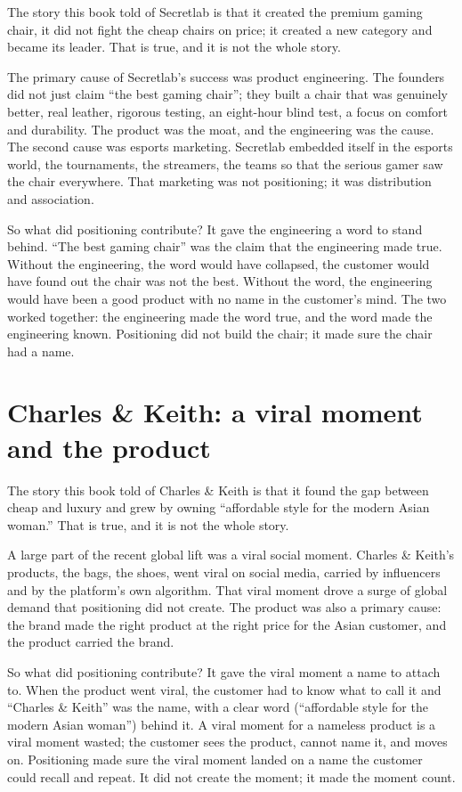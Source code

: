 \documentclass[10pt,twoside,openany]{memoir}
\newcommand{\needspacehead}{\needspace{4\baselineskip}}
\let\oldsection\section
\renewcommand{\section}{\needspacehead\oldsection}
\begin{document}
{The story this book told of Secretlab is that it created the premium
gaming chair, it did not fight the cheap chairs on price; it created a
new category and became its leader. That is true, and it is not the
whole story.

The primary cause of Secretlab's success was product engineering. The
founders did not just claim ``the best gaming chair''; they built a
chair that was genuinely better, real leather, rigorous testing, an
eight-hour blind test, a focus on comfort and durability. The product
was the moat, and the engineering was the cause. The second cause was
esports marketing. Secretlab embedded itself in the esports world, the
tournaments, the streamers, the teams so that the serious gamer saw the
chair everywhere. That marketing was not positioning; it was
distribution and association.

So what did positioning contribute? It gave the engineering a word to
stand behind. ``The best gaming chair'' was the claim that the
engineering made true. Without the engineering, the word would have
collapsed, the customer would have found out the chair was not the best.
Without the word, the engineering would have been a good product with no
name in the customer's mind. The two worked together: the engineering
made the word true, and the word made the engineering known. Positioning
did not build the chair; it made sure the chair had a name.

\section{Charles \& Keith: a viral moment and the
product}\label{charles-keith-a-viral-moment-and-the-product}

The story this book told of Charles \& Keith is that it found the gap
between cheap and luxury and grew by owning ``affordable style for the
modern Asian woman.'' That is true, and it is not the whole story.

A large part of the recent global lift was a viral social moment.
Charles \& Keith's products, the bags, the shoes, went viral on social
media, carried by influencers and by the platform's own algorithm. That
viral moment drove a surge of global demand that positioning did not
create. The product was also a primary cause: the brand made the right
product at the right price for the Asian customer, and the product
carried the brand.

So what did positioning contribute? It gave the viral moment a name to
attach to. When the product went viral, the customer had to know what to
call it and ``Charles \& Keith'' was the name, with a clear word
(``affordable style for the modern Asian woman'') behind it. A viral
moment for a nameless product is a viral moment wasted; the customer
sees the product, cannot name it, and moves on. Positioning made sure
the viral moment landed on a name the customer could recall and repeat.
It did not create the moment; it made the moment count.

}
\end{document}
